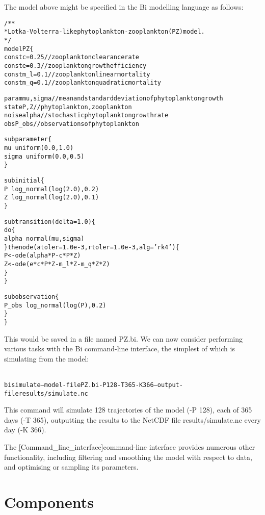 The model above might be specified in the Bi modelling language as follows:
\begin{alltt}{\sf
    /**
     * Lotka-Volterra-like phytoplankton-zooplankton (PZ) model.
     */
    model PZ \{
      const c = 0.25     // zooplankton clearance rate
      const e = 0.3      // zooplankton growth efficiency
      const m_l = 0.1    // zooplankton linear mortality
      const m_q = 0.1    // zooplankton quadratic mortality

      param mu, sigma     // mean and standard deviation of phytoplankton growth
      state P, Z         // phytoplankton, zooplankton
      noise alpha        // stochastic phytoplankton growth rate
      obs P_obs          // observations of phytoplankton
  
      sub parameter \{
        mu ~ uniform(0.0, 1.0)
        sigma ~ uniform(0.0, 0.5)
      \}
  
      sub initial \{
        P ~ log_normal(log(2.0), 0.2)
        Z ~ log_normal(log(2.0), 0.1)
      \}

      sub transition(delta = 1.0) \{
        do \{
          alpha ~ normal(mu, sigma)
        \} then ode(atoler = 1.0e-3, rtoler = 1.0e-3, alg = 'rk4') \{
          P <- ode(alpha*P - c*P*Z)
          Z <- ode(e*c*P*Z - m_l*Z - m_q*Z*Z)
        \}
      \}

      sub observation \{
        P_obs ~ log_normal(log(P), 0.2)
      \}
    \}
}\end{alltt}

This would be saved in a file named {\sf PZ.bi}. We can now consider
performing various tasks with the Bi command-line interface, the simplest of
which is simulating from the model:
\begin{alltt}{\sf
bi simulate --model-file PZ.bi -P 128 -T 365 -K 366 --output-file results/simulate.nc
}\end{alltt}
This command will simulate 128 trajectories of the model ({\sf -P 128}), each
of 365 days ({\sf -T 365}), outputting the results to the NetCDF
file {\sf results/simulate.nc} every day ({\sf -K 366}).

The \hyperref[hyper][Command_line_interface]{command-line interface} provides
numerous other functionality, including filtering and smoothing the model with
respect to data, and optimising or sampling its parameters.

\section{Components\label{Components}}

